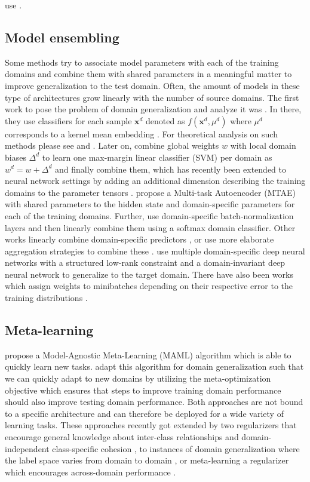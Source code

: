 \citet{MatsuuraH20} use . 

\subsection{Model ensembling}

Some methods try to associate model parameters with each of the training domains and combine them with shared parameters in a meaningful matter to improve generalization to the test domain. Often, the amount of models in these type of architectures grow linearly with the number of source domains. The first work to pose the problem of domain generalization and analyze it was \citet{BlanchardLS11}. In there, they use classifiers for each sample $\mathbf{x}^d$  denoted as $f(\mathbf{x}^d,\mu^d)$ where $\mu^d$ corresponds to a kernel mean embedding \citep{MuandetFSS17}. For theoretical analysis on such methods please see \citet{an2019generalization} and \citet{blanchard2017domain}. Later on, \citet{KhoslaZMET12} combine global weights $w$ with local domain biases $\Delta^d$ to learn one max-margin linear classifier (SVM) per domain as $w^d = w + \Delta^d$ and finally combine them, which has recently been extended to neural network settings by adding an additional dimension describing the training domains to the parameter tensors \citep{LiYSH17}. \citet{GhifaryKZB15} propose a Multi-task Autoencoder (MTAE) with shared parameters to the hidden state and domain-specific parameters for each of the training domains. Further, \citet{ManciniBCR18} use domain-specific batch-normalization \citep{IoffeS15} layers and then linearly combine them using a softmax domain classifier. Other works linearly combine domain-specific predictors \citep{ManciniBC018}, or use more elaborate aggregation strategies to combine these \citep{DInnocenteC18}. \citet{DingF18} use multiple
domain-specific deep neural networks with a structured low-rank constraint and a domain-invariant deep neural network to generalize to the target domain. There have also been works which assign weights to minibatches depending on their respective error to the training distributions \citep{HuNSS18, sagawa2019distributionally}.


\subsection{Meta-learning}
\citet{LiYSH18} propose a Model-Agnostic Meta-Learning (MAML) algorithm which is able to quickly learn new tasks. \citet{FinnAL17} adapt this algorithm for domain generalization such that we can quickly adapt to new domains by utilizing the meta-optimization objective which ensures that steps to improve training domain performance should also improve testing domain performance. Both approaches are not bound to a specific architecture and can therefore be deployed for a wide variety of learning tasks. These approaches recently got extended by two regularizers that encourage general knowledge about inter-class relationships and domain-independent class-specific cohesion \citep{DouCKG19}, to instances of domain generalization where the label space varies from domain to domain \citep{LiYZH19}, or meta-learning a regularizer which encourages across-domain performance \citep{BalajiSC18}.

